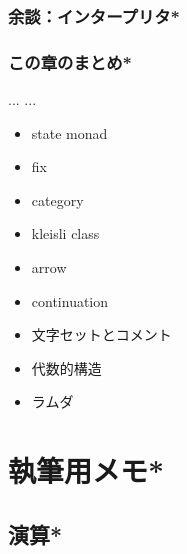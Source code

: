 \documentclass[a5paper,twoside,fleqn,draft]{jsbook}
\begin{document}
\section{余談：インタープリタ*}

\section{この章のまとめ*}

\begin{note}{...}
...
\end{note}


\begin{itemize}
\item state monad
\item fix
\item category
\item kleisli class
\item arrow
\item continuation
\item 文字セットとコメント
\item 代数的構造
\item ラムダ
\end{itemize}

\part{執筆用メモ*}



\chapter{演算*}
\label{ch:arithmetic}
\end{document}
